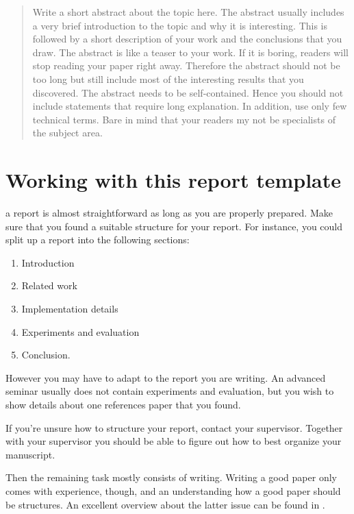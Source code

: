 \documentclass[10pt,a4paper,twoside,journal]{IEEEtran}
\begin{document}
\begin{abstract}
	Write a short abstract about the topic here. The abstract usually includes a
	very brief introduction to the topic and why it is interesting. This is
	followed by a short description of your work and the conclusions that you
	draw. The abstract is like a teaser to your work. If it is boring, readers
	will stop reading your paper right away. Therefore the abstract should not
	be too long but still include most of the interesting results that you
	discovered.
	The abstract needs to be self-contained. Hence you should not include
	statements that require long explanation. In addition, use only few
	technical terms. Bare in mind that your readers my not be specialists of
	the subject area.
\end{abstract}

%
%
\section{Working with this report template}

 a report is almost straightforward as long as you are
properly prepared. Make sure that you found a suitable structure for your
report. For instance, you could split up a report into the following sections:

\begin{enumerate}
	\item Introduction
	\item Related work
	\item Implementation details
	\item Experiments and evaluation
	\item Conclusion.
\end{enumerate}

However you may have to adapt to the report you are writing. An advanced seminar
usually does not contain experiments and evaluation, but you wish to show
details about one references paper that you found.

If you're unsure how to structure your report, contact your supervisor. Together
with your supervisor you should be able to figure out how to best organize your
manuscript.

Then the remaining task mostly consists of writing. Writing a good paper only
comes with experience, though, and an understanding how a good paper should be
structures. An excellent overview about the latter issue can be found in
\cite{katzoff1964}.
\end{document}
